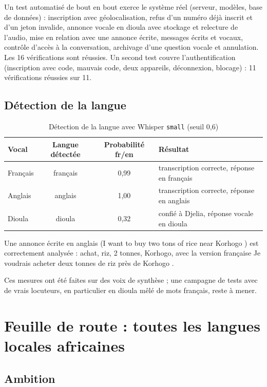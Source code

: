 \documentclass[12pt,a4paper]{article}
\begin{document}
Un test automatisé de bout en bout exerce le système réel (serveur, modèles, base de données) :
inscription avec géolocalisation, refus d'un numéro déjà inscrit et d'un jeton invalide, annonce
vocale en dioula avec stockage et relecture de l'audio, mise en relation avec une annonce écrite,
messages écrits et vocaux, contrôle d'accès à la conversation, archivage d'une question vocale et
annulation. Les 16 vérifications sont réussies. Un second test couvre l'authentification
(inscription avec code, mauvais code, deux appareils, déconnexion, blocage) : 11 vérifications
réussies sur 11.

\subsection{Détection de la langue}

\begin{table}[h]
\centering
\begin{tabularx}{\textwidth}{lccL}
\toprule
Vocal & Langue détectée & Probabilité fr/en & Résultat \\
\midrule
Français & français & 0,99 & transcription correcte, réponse en français \\
Anglais & anglais & 1,00 & transcription correcte, réponse en anglais \\
Dioula & dioula & 0,32 & confié à Djelia, réponse vocale en dioula \\
\bottomrule
\end{tabularx}
\caption{Détection de la langue avec Whisper \texttt{small} (seuil 0,6)}
\end{table}

Une annonce écrite en anglais (\og I want to buy two tons of rice near Korhogo \fg{}) est correctement
analysée : achat, riz, 2 tonnes, Korhogo, avec la version française \og Je voudrais acheter deux
tonnes de riz près de Korhogo \fg{}.

Ces mesures ont été faites sur des voix de synthèse ; une campagne de tests avec de vrais locuteurs,
en particulier en dioula mêlé de mots français, reste à mener.

\section{Feuille de route : toutes les langues locales africaines}
\label{sec:roadmap}

\subsection{Ambition}
\end{document}
